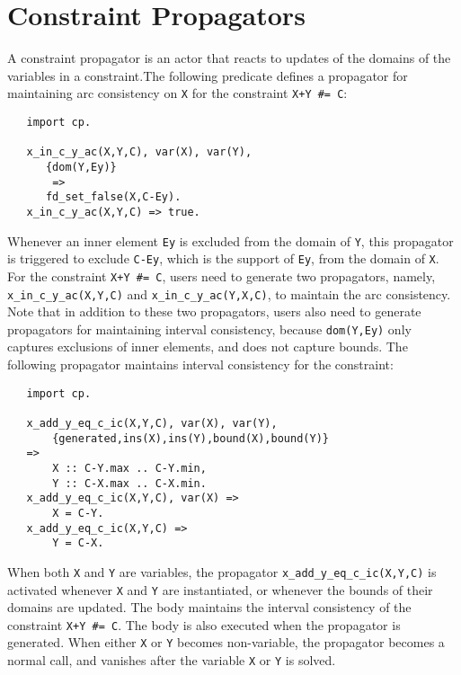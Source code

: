 \section{Constraint Propagators}
A constraint propagator is an actor that reacts to updates of the domains of the variables in a constraint.The following predicate defines a propagator for maintaining arc consistency on \texttt{X} for the constraint \verb-X+Y #= C-:
\begin{verbatim}
   import cp.

   x_in_c_y_ac(X,Y,C), var(X), var(Y),
      {dom(Y,Ey)}
       =>         
      fd_set_false(X,C-Ey).
   x_in_c_y_ac(X,Y,C) => true.
\end{verbatim}
Whenever an inner element \texttt{Ey} is excluded from the domain of \texttt{Y}, this propagator is triggered to exclude \texttt{C-Ey}, which is the support of \texttt{Ey}, from the domain of \texttt{X}. For the constraint \verb-X+Y #= C-, users need to generate two propagators, namely, \texttt{x\_in\_c\_y\_ac(X,Y,C)} and \texttt{x\_in\_c\_y\_ac(Y,X,C)}, to maintain the arc consistency. Note that in addition to these two propagators, users also need to generate propagators for maintaining interval consistency, because \texttt{dom(Y,Ey)} only captures exclusions of inner elements, and does not capture bounds. The following propagator maintains interval consistency for the constraint:
\begin{verbatim}
   import cp.

   x_add_y_eq_c_ic(X,Y,C), var(X), var(Y),
       {generated,ins(X),ins(Y),bound(X),bound(Y)}
   =>         
       X :: C-Y.max .. C-Y.min,
       Y :: C-X.max .. C-X.min.
   x_add_y_eq_c_ic(X,Y,C), var(X) =>
       X = C-Y.
   x_add_y_eq_c_ic(X,Y,C) =>
       Y = C-X.
\end{verbatim}
When both \texttt{X} and \texttt{Y} are variables, the propagator \texttt{x\_add\_y\_eq\_c\_ic(X,Y,C)} is activated whenever \texttt{X} and \texttt{Y} are instantiated, or whenever the bounds of their domains are updated. The body maintains the interval consistency of the constraint \verb-X+Y #= C-. The body is also executed when the propagator is generated. When either \texttt{X} or \texttt{Y} becomes non-variable, the propagator becomes a normal call, and vanishes after the variable \texttt{X} or \texttt{Y} is solved.

